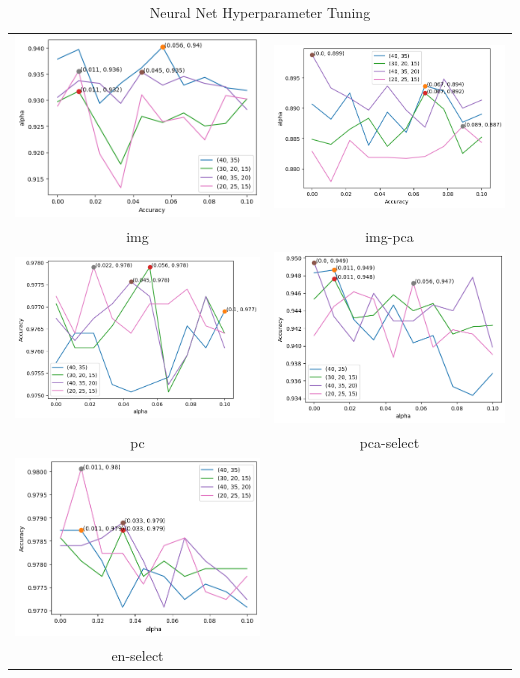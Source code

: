 \documentclass{article}
\begin{document}
\begin{table}[H]
    \centering
    \footnotesize
    \begin{tabular}{cc}
        \includegraphics[width = .45\textwidth]{images/nn-tune-images.png} & \includegraphics[width = .48\textwidth]{images/nn-tune-imagepca.png} \\
        img  &  img-pca \\
         \includegraphics[width = .5\textwidth]{images/nn-tune-pca4.png}& \includegraphics[width = .45\textwidth]{images/nn-tune-pcavar.png}\\
         pc & pca-select \\
         \includegraphics[width = .45\textwidth]{images/nn-tune-en.png} &\\
         en-select & 
    \end{tabular}
    \caption{Neural Net Hyperparameter Tuning}
    \label{nn-tune}
\end{table}
\end{document}
